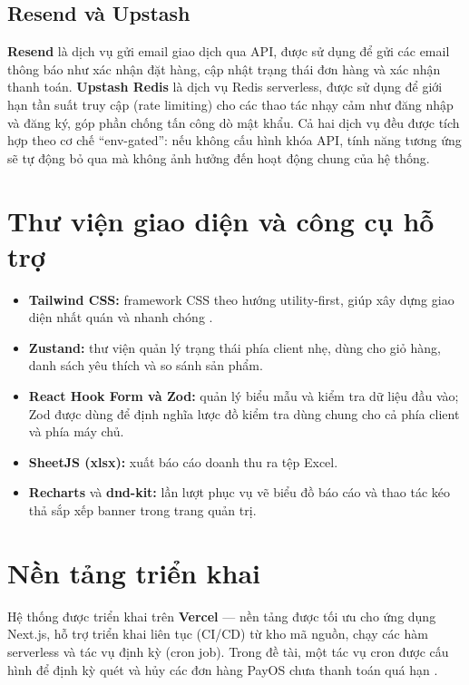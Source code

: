 \subsection{Resend và Upstash}

\textbf{Resend} là dịch vụ gửi email giao dịch qua API, được sử dụng để gửi các email thông báo
như xác nhận đặt hàng, cập nhật trạng thái đơn hàng và xác nhận thanh toán. \textbf{Upstash
Redis} là dịch vụ Redis serverless, được sử dụng để giới hạn tần suất truy cập (rate limiting) cho
các thao tác nhạy cảm như đăng nhập và đăng ký, góp phần chống tấn công dò mật khẩu. Cả hai
dịch vụ đều được tích hợp theo cơ chế ``env-gated'': nếu không cấu hình khóa API, tính năng tương
ứng sẽ tự động bỏ qua mà không ảnh hưởng đến hoạt động chung của hệ thống.

\section{Thư viện giao diện và công cụ hỗ trợ}

\begin{itemize}
  \item \textbf{Tailwind CSS:} framework CSS theo hướng utility-first, giúp xây dựng giao diện
  nhất quán và nhanh chóng \cite{tailwind}.
  \item \textbf{Zustand:} thư viện quản lý trạng thái phía client nhẹ, dùng cho giỏ hàng, danh sách
  yêu thích và so sánh sản phẩm.
  \item \textbf{React Hook Form và Zod:} quản lý biểu mẫu và kiểm tra dữ liệu đầu vào; Zod được
  dùng để định nghĩa lược đồ kiểm tra dùng chung cho cả phía client và phía máy chủ.
  \item \textbf{SheetJS (xlsx):} xuất báo cáo doanh thu ra tệp Excel.
  \item \textbf{Recharts} và \textbf{dnd-kit:} lần lượt phục vụ vẽ biểu đồ báo cáo và thao tác kéo
  thả sắp xếp banner trong trang quản trị.
\end{itemize}

\section{Nền tảng triển khai}

Hệ thống được triển khai trên \textbf{Vercel} --- nền tảng được tối ưu cho ứng dụng Next.js, hỗ trợ
triển khai liên tục (CI/CD) từ kho mã nguồn, chạy các hàm serverless và tác vụ định kỳ (cron
job). Trong đề tài, một tác vụ cron được cấu hình để định kỳ quét và hủy các đơn hàng PayOS chưa
thanh toán quá hạn \cite{vercel}.
